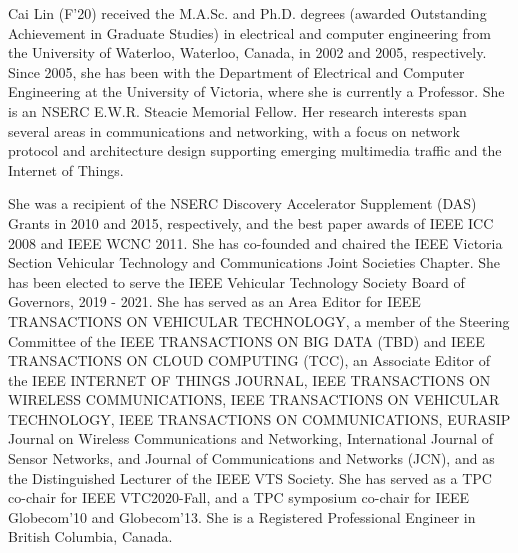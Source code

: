 \documentclass[12pt,journal,draftclsnofoot,onecolumn]{IEEEtran}
\begin{document}
\begin{IEEEbiographynophoto}{Cai Lin}
(F'20) received the M.A.Sc. and Ph.D. degrees (awarded Outstanding Achievement in Graduate Studies) in electrical and computer engineering from the University of Waterloo, Waterloo, Canada, in 2002 and 2005, respectively. Since 2005, she has been with the Department of Electrical and 
Computer Engineering at the University of Victoria, where she is currently a Professor. 
She is an NSERC E.W.R. Steacie Memorial Fellow. Her research interests span several areas in communications and networking, with a focus on network protocol and architecture design supporting emerging multimedia traffic and the Internet of Things. 

She was a recipient of the NSERC Discovery Accelerator Supplement (DAS) Grants in 2010 and 2015, respectively, and the best paper awards of IEEE ICC 2008 and IEEE WCNC 2011. She has co-founded and chaired the IEEE Victoria Section Vehicular Technology and Communications Joint Societies Chapter. 
She has been elected to serve the IEEE Vehicular Technology Society Board of Governors, 2019 - 2021. She has served as an Area Editor for IEEE TRANSACTIONS ON VEHICULAR TECHNOLOGY, a member of the Steering Committee of the IEEE TRANSACTIONS ON BIG DATA (TBD) and IEEE TRANSACTIONS ON CLOUD COMPUTING (TCC), an Associate Editor of the IEEE INTERNET OF THINGS JOURNAL, IEEE TRANSACTIONS ON WIRELESS COMMUNICATIONS, IEEE TRANSACTIONS ON VEHICULAR TECHNOLOGY, IEEE TRANSACTIONS ON COMMUNICATIONS, EURASIP Journal on Wireless Communications and Networking, International Journal of Sensor Networks, and Journal of Communications and Networks (JCN), and as the Distinguished Lecturer of the IEEE VTS Society. She has served as a TPC co-chair for IEEE VTC2020-Fall, and a TPC symposium co-chair for IEEE Globecom’10 and Globecom’13. She is a Registered Professional Engineer in British Columbia, Canada.
\end{IEEEbiographynophoto}
\vspace{-20pt}
\end{document}
